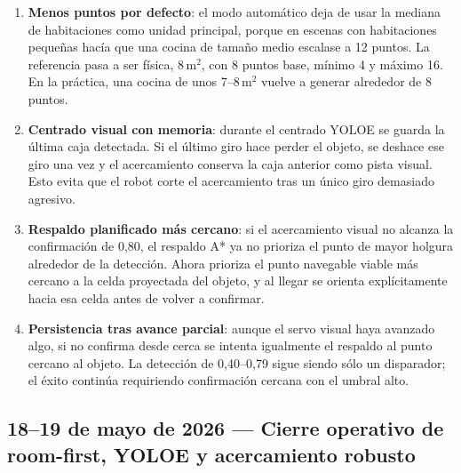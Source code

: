 \documentclass[11pt,a4paper]{article}
\begin{document}
\begin{enumerate}
  \item \textbf{Menos puntos por defecto}: el modo automático deja de usar la
        mediana de habitaciones como unidad principal, porque en escenas con
        habitaciones pequeñas hacía que una cocina de tamaño medio escalase a
        12 puntos. La referencia pasa a ser física, 8\,m\(^2\), con 8 puntos
        base, mínimo 4 y máximo 16. En la práctica, una cocina de unos
        7--8\,m\(^2\) vuelve a generar alrededor de 8 puntos.
  \item \textbf{Centrado visual con memoria}: durante el centrado YOLOE se
        guarda la última caja detectada. Si el último giro hace perder el
        objeto, se deshace ese giro una vez y el acercamiento conserva la caja
        anterior como pista visual. Esto evita que el robot corte el
        acercamiento tras un único giro demasiado agresivo.
  \item \textbf{Respaldo planificado más cercano}: si el acercamiento visual no
        alcanza la confirmación de 0,80, el respaldo A* ya no prioriza el punto
        de mayor holgura alrededor de la detección. Ahora prioriza el punto
        navegable viable más cercano a la celda proyectada del objeto, y al
        llegar se orienta explícitamente hacia esa celda antes de volver a
        confirmar.
  \item \textbf{Persistencia tras avance parcial}: aunque el servo visual haya
        avanzado algo, si no confirma desde cerca se intenta igualmente el
        respaldo al punto cercano al objeto. La detección de 0,40--0,79 sigue
        siendo sólo un disparador; el éxito continúa requiriendo confirmación
        cercana con el umbral alto.
\end{enumerate}

\subsection*{18--19 de mayo de 2026 --- Cierre operativo de room-first, YOLOE y acercamiento robusto}
\end{document}
